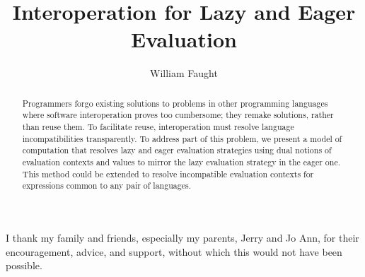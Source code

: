 \documentclass[12pt]{ucthesis}
\begin{document}
\title{Interoperation for Lazy and Eager Evaluation}
\author{William Faught}
\maketitle
\begin{frontmatter}
\copyrightpage
\approvalpage

\begin{abstract}
Programmers forgo existing solutions to problems in other programming languages where software interoperation proves too cumbersome; they remake solutions, rather than reuse them. To facilitate reuse, interoperation must resolve language incompatibilities transparently. To address part of this problem, we present a model of computation that resolves lazy and eager evaluation strategies using dual notions of evaluation contexts and values to mirror the lazy evaluation strategy in the eager one. This method could be extended to resolve incompatible evaluation contexts for expressions common to any pair of languages.
\end{abstract}

\begin{acknowledgements}
\indent\indent I thank my family and friends, especially my parents, Jerry and Jo Ann, for their encouragement, advice, and support, without which this would not have been possible.
\end{acknowledgements}

\tableofcontents
\listoffigures
\end{frontmatter}
\pagestyle{plain}
\renewcommand{\baselinestretch}{1.66}






\clearpage



\end{document}

